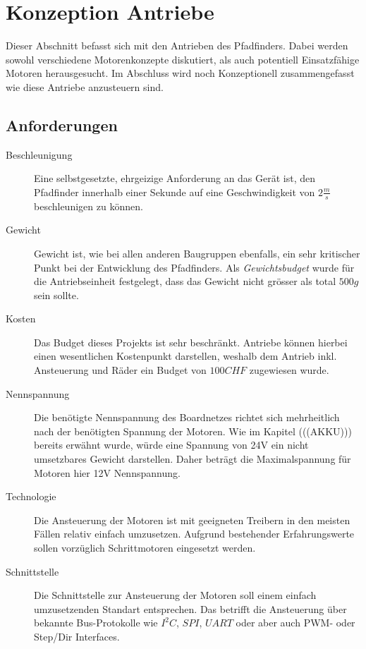 \documentclass[main.tex]{subfiles} %
\begin{document}
\section{Konzeption Antriebe}

Dieser Abschnitt befasst sich mit den Antrieben des Pfadfinders. Dabei werden
sowohl verschiedene Motorenkonzepte diskutiert, als auch potentiell
Einsatzfähige Motoren herausgesucht. Im Abschluss wird noch Konzeptionell
zusammengefasst wie diese Antriebe anzusteuern sind.

\subsection{Anforderungen}

\begin{description}
    \item[Beschleunigung] Eine selbstgesetzte, ehrgeizige Anforderung an das Gerät ist,
          den Pfadfinder innerhalb einer Sekunde auf eine Geschwindigkeit von $2
              \frac{m}{s} $ beschleunigen zu können.

    \item[Gewicht] Gewicht ist, wie bei allen anderen Baugruppen ebenfalls, ein sehr
          kritischer Punkt bei der Entwicklung des Pfadfinders. Als
          \textit{Gewichtsbudget} wurde für die Antriebseinheit festgelegt, dass das
          Gewicht nicht grösser als total $500 g$ sein sollte.

    \item[Kosten] Das Budget dieses Projekts ist sehr beschränkt. Antriebe können hierbei
          einen wesentlichen Kostenpunkt darstellen, weshalb dem Antrieb inkl.
          Ansteuerung und Räder ein Budget von $100 CHF$ zugewiesen wurde.

    \item[Nennspannung] Die benötigte Nennspannung des Boardnetzes richtet sich
          mehrheitlich nach der benötigten Spannung der Motoren. Wie im Kapitel
          (((AKKU))) bereits erwähnt wurde, würde eine Spannung von 24V ein nicht
          umsetzbares Gewicht darstellen. Daher beträgt die Maximalspannung für Motoren
          hier 12V Nennspannung.

    \item[Technologie] Die Ansteuerung der Motoren ist mit geeigneten Treibern in den
          meisten Fällen relativ einfach umzusetzen. Aufgrund bestehender Erfahrungswerte
          sollen vorzüglich Schrittmotoren eingesetzt werden.

    \item[Schnittstelle] Die Schnittstelle zur Ansteuerung der Motoren soll einem einfach
          umzusetzenden Standart entsprechen. Das betrifft die Ansteuerung über bekannte
          Bus-Protokolle wie $I^2C$, $SPI$, $UART$ oder aber auch PWM- oder Step/Dir
          Interfaces.

\end{description}
\end{document}
